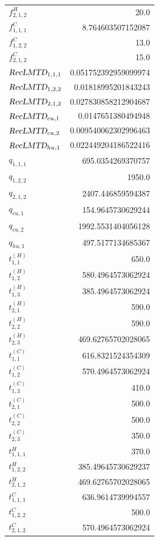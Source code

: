 \documentclass{article}%
\begin{document}
\begin{multicols*}{3}
\begin{supertabular}{lr}
	$f_{2,1,2}^{H}$ & 20.0 \\%
	$f_{1,1,1}^{C}$ & 8.764603507152087 \\%
	$f_{1,2,2}^{C}$ & 13.0 \\%
	$f_{2,1,2}^{C}$ & 15.0 \\%
	$\textsl{RecLMTD}_{1,1,1}$ & 0.051752392959099974 \\%
	$\textsl{RecLMTD}_{1,2,2}$ & 0.01818995201843243 \\%
	$\textsl{RecLMTD}_{2,1,2}$ & 0.027830858212904687 \\%
	$\textsl{RecLMTD}_{cu,1}$ & 0.0147651380494948 \\%
	$\textsl{RecLMTD}_{cu,2}$ & 0.009540062302996463 \\%
	$\textsl{RecLMTD}_{hu,1}$ & 0.022449204186522416 \\%
	$q_{1,1,1}$ & 695.0354269370757 \\%
	$q_{1,2,2}$ & 1950.0 \\%
	$q_{2,1,2}$ & 2407.446859594387 \\%
	$q_{cu,1}$ & 154.9645730629244 \\%
	$q_{cu,2}$ & 1992.5531404056128 \\%
	$q_{hu,1}$ & 497.5177134685367 \\%
	$t_{1,1}^{(H)}$ & 650.0 \\%
	$t_{1,2}^{(H)}$ & 580.4964573062924 \\%
	$t_{1,3}^{(H)}$ & 385.4964573062924 \\%
	$t_{2,1}^{(H)}$ & 590.0 \\%
	$t_{2,2}^{(H)}$ & 590.0 \\%
	$t_{2,3}^{(H)}$ & 469.62765702028065 \\%
	$t_{1,1}^{(C)}$ & 616.8321524354309 \\%
	$t_{1,2}^{(C)}$ & 570.4964573062924 \\%
	$t_{1,3}^{(C)}$ & 410.0 \\%
	$t_{2,1}^{(C)}$ & 500.0 \\%
	$t_{2,2}^{(C)}$ & 500.0 \\%
	$t_{2,3}^{(C)}$ & 350.0 \\%
	$t_{1,1,1}^{H}$ & 370.0 \\%
	$t_{1,2,2}^{H}$ & 385.49645730629237 \\%
	$t_{2,1,2}^{H}$ & 469.62765702028065 \\%
	$t_{1,1,1}^{C}$ & 636.9614739994557 \\%
	$t_{1,2,2}^{C}$ & 500.0 \\%
	$t_{2,1,2}^{C}$ & 570.4964573062924 \\%

\end{supertabular}
\end{multicols*}
\end{document}

